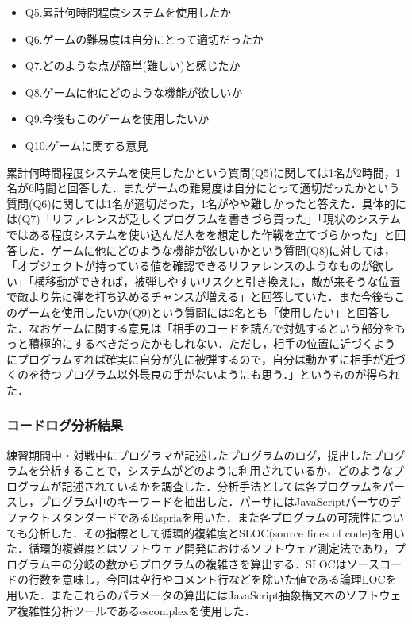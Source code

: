 \begin{itemize}
  \item Q5.累計何時間程度システムを使用したか
  \item Q6.ゲームの難易度は自分にとって適切だったか
  \item Q7.どのような点が簡単(難しい)と感じたか
  \item Q8.ゲームに他にどのような機能が欲しいか
  \item Q9.今後もこのゲームを使用したいか
  \item Q10.ゲームに関する意見
\end{itemize}

累計何時間程度システムを使用したかという質問(Q5)に関しては1名が2時間，1名が6時間と回答した．またゲームの難易度は自分にとって適切だったかという質問(Q6)に関しては1名が適切だった，1名がやや難しかったと答えた．具体的には(Q7)「リファレンスが乏しくプログラムを書きづら買った」「現状のシステムではある程度システムを使い込んだ人をを想定した作戦を立てづらかった」と回答した．ゲームに他にどのような機能が欲しいかという質問(Q8)に対しては，「オブジェクトが持っている値を確認できるリファレンスのようなものが欲しい」「横移動ができれば，被弾しやすいリスクと引き換えに，敵が来そうな位置で敵より先に弾を打ち込めるチャンスが増える」と回答していた．また今後もこのゲームを使用したいか(Q9)という質問には2名とも「使用したい」と回答した．なおゲームに関する意見は「相手のコードを読んで対処するという部分をもっと積極的にするべきだったかもしれない．ただし，相手の位置に近づくようにプログラムすれば確実に自分が先に被弾するので，自分は動かずに相手が近づくのを待つプログラム以外最良の手がないようにも思う．」というものが得られた．

\subsubsection{コードログ分析結果}

練習期間中・対戦中にプログラマが記述したプログラムのログ，提出したプログラムを分析することで，システムがどのように利用されているか，どのようなプログラムが記述されているかを調査した．分析手法としては各プログラムをパースし，プログラム中のキーワードを抽出した．パーサにはJavaScriptパーサのデファクトスタンダードであるEspria\cite{esprima}を用いた．また各プログラムの可読性についても分析した．その指標として循環的複雑度とSLOC(source lines of code)を用いた．循環的複雑度とはソフトウェア開発におけるソフトウェア測定法であり，プログラム中の分岐の数からプログラムの複雑さを算出する．SLOCはソースコードの行数を意味し，今回は空行やコメント行などを除いた値である論理LOCを用いた．またこれらのパラメータの算出にはJavaScript抽象構文木のソフトウェア複雑性分析ツールであるescomplex\cite{escomplex}を使用した．

